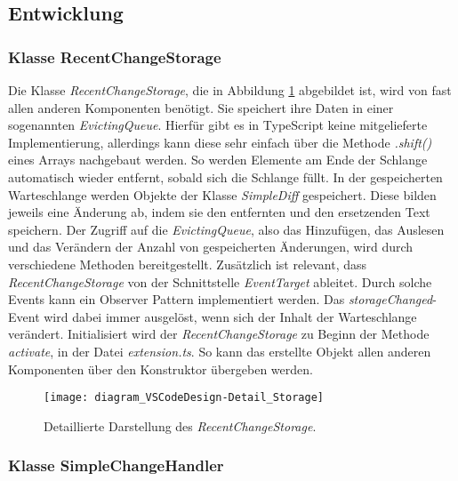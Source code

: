 \subsection{Entwicklung}

\subsubsection{Klasse RecentChangeStorage}

Die Klasse \emph{RecentChangeStorage}, 
die in Abbildung \ref{fig:diagram_VSCodeDesign-Detail_Storage} abgebildet ist,
wird von fast allen anderen Komponenten benötigt. Sie speichert ihre
Daten in einer sogenannten \emph{EvictingQueue}. Hierfür gibt es in
TypeScript keine mitgelieferte Implementierung, allerdings kann
diese sehr einfach über die Methode \emph{.shift()} eines Arrays
nachgebaut werden. So werden Elemente am Ende der Schlange automatisch
wieder entfernt, sobald sich die Schlange füllt. 
In der gespeicherten Warteschlange werden
Objekte der Klasse \emph{SimpleDiff} gespeichert. Diese bilden jeweils
eine Änderung ab, indem sie den entfernten und den ersetzenden Text
speichern. Der Zugriff auf die \emph{EvictingQueue}, also das Hinzufügen, 
das Auslesen und das Verändern der Anzahl von gespeicherten
Änderungen, wird durch verschiedene Methoden bereitgestellt.
Zusätzlich ist relevant, dass \emph{RecentChangeStorage} von der
Schnittstelle \emph{EventTarget} ableitet. Durch solche Events
kann ein Observer Pattern implementiert werden. Das 
\emph{storageChanged}-Event wird dabei immer ausgelöst, 
wenn sich der Inhalt der Warteschlange
verändert. Initialisiert wird der \emph{RecentChangeStorage} zu Beginn der
Methode \emph{activate}, in der Datei \emph{extension.ts}. So kann
das erstellte Objekt allen anderen Komponenten über den Konstruktor
übergeben werden.

\begin{figure}
    \centering
    \texttt{[image: diagram\_VSCodeDesign-Detail\_Storage]}
    \caption{Detaillierte Darstellung des \emph{RecentChangeStorage}.}
    \label{fig:diagram_VSCodeDesign-Detail_Storage}
\end{figure}   

\subsubsection{Klasse SimpleChangeHandler}

